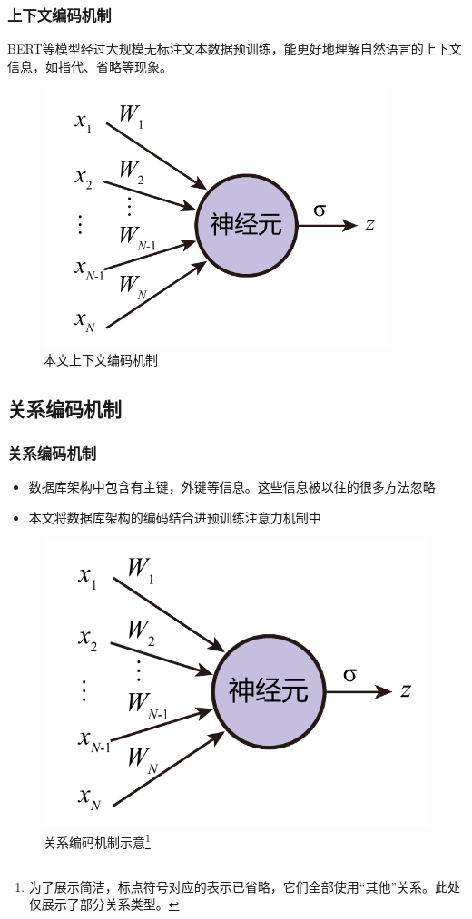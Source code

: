 \documentclass{ctexbeamer}
\begin{document}
\begin{frame}
  \frametitle{上下文编码机制}
  BERT等模型经过大规模无标注文本数据预训练，能更好地理解自然语言的上下文信息，如指代、省略等现象。
  \begin{figure}
    \includegraphics[page=9,width=0.9\textwidth]{figure/figures.pdf}
    \caption{本文上下文编码机制}
  \end{figure}
\end{frame}

\subsection{关系编码机制}
\begin{frame}
  \frametitle{关系编码机制}
  \begin{itemize}
    \item 数据库架构中包含有主键，外键等信息。这些信息被以往的很多方法忽略
    \item 本文将数据库架构的编码结合进预训练注意力机制中
  \end{itemize}

  \begin{figure}
    \includegraphics[page=10,width=\textwidth]{figure/figures.pdf}
    \caption{关系编码机制示意\footnote{为了展示简洁，标点符号对应的表示已省略，它们全部使用“其他”关系。此处仅展示了部分关系类型。}}
  \end{figure}
\end{frame}
\end{document}
